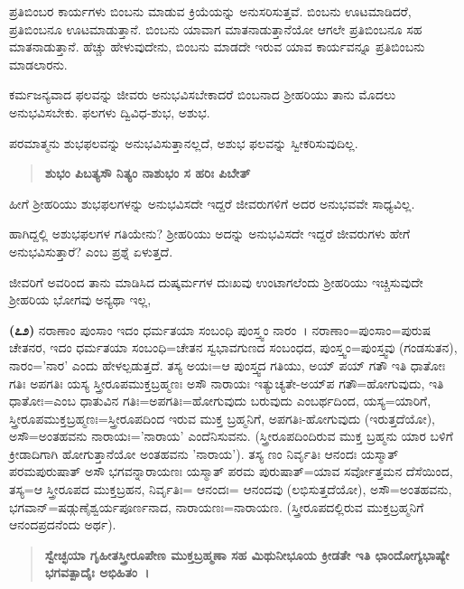 
\vskip 3pt

ಪ್ರತಿಬಿಂಬರ ಕಾರ್ಯಗಳು ಬಿಂಬನು ಮಾಡುವ ಕ್ರಿಯೆಯನ್ನು ಅನುಸರಿಸುತ್ತವೆ. ಬಿಂಬನು ಊಟಮಾಡಿದರೆ, ಪ್ರತಿಬಿಂಬನೂ ಊಟಮಾಡುತ್ತಾನೆ. ಬಿಂಬನು ಯಾವಾಗ ಮಾತನಾಡುತ್ತಾನೆಯೋ ಆಗಲೇ ಪ್ರತಿಬಿಂಬನೂ ಸಹ ಮಾತನಾಡುತ್ತಾನೆ. ಹೆಚ್ಚು ಹೇಳುವು\-ದೇನು, ಬಿಂಬನು ಮಾಡದೇ ಇರುವ ಯಾವ ಕಾರ್ಯವನ್ನೂ ಪ್ರತಿಬಿಂಬನು ಮಾಡಲಾರನು.

ಕರ್ಮಜನ್ಯವಾದ ಫಲವನ್ನು ಜೀವರು ಅನುಭವಿಸಬೇಕಾದರೆ ಬಿಂಬನಾದ ಶ‍್ರೀಹರಿಯು ತಾನು ಮೊದಲು ಅನುಭವಿಸಬೇಕು. ಫಲಗಳು ದ್ವಿವಿಧ-ಶುಭ, ಅಶುಭ.

ಪರಮಾತ್ಮನು ಶುಭಫಲವನ್ನು ಅನುಭವಿಸುತ್ತಾನಲ್ಲದೆ, ಅಶುಭ ಫಲವನ್ನು ಸ್ವೀಕರಿಸುವುದಿಲ್ಲ.

\begin{verse}
\textbf{ಶುಭಂ ಪಿಬತ್ಯಸೌ ನಿತ್ಯಂ ನಾಶುಭಂ ಸ ಹರಿಃ ಪಿಬೇತ್}
\end{verse}

\vspace{-.1cm}


\vskip 3pt

ಹೀಗೆ ಶ‍್ರೀಹರಿಯು ಶುಭಫಲಗಳನ್ನು ಅನುಭವಿಸದೇ ಇದ್ದರೆ ಜೀವರುಗಳಿಗೆ ಅದರ ಅನುಭವವೇ ಸಾಧ್ಯವಿಲ್ಲ.

ಹಾಗಿದ್ದಲ್ಲಿ ಅಶುಭಫಲಗಳ ಗತಿಯೇನು? ಶ‍್ರೀಹರಿಯು ಅದನ್ನು ಅನುಭವಿಸದೇ ಇದ್ದರೆ ಜೀವರುಗಳು ಹೇಗೆ ಅನುಭವಿಸುತ್ತಾರೆ? ಎಂಬ ಪ್ರಶ್ನೆ ಏಳುತ್ತದೆ.

ಜೀವರಿಗೆ ಅವರಿಂದ ತಾನು ಮಾಡಿಸಿದ ದುಷ್ಕರ್ಮಗಳ ದುಃಖವು ಉಂಟಾಗಲೆಂದು ಶ‍್ರೀಹರಿಯು ಇಚ್ಚಿಸುವುದೇ ಶ‍್ರೀಹರಿಯ ಭೋಗವು ಅನ್ಯಥಾ ಇಲ್ಲ,

\textbf{(೭೨)} ನರಾಣಾಂ ಪುಂಸಾಂ ಇದಂ ಧರ್ಮತಯಾ ಸಂಬಂಧಿ ಪುಂಸ್ತ್ವಂ ನಾರಂ~। ನರಾಣಾಂ=ಪುಂಸಾಂ=ಪುರುಷ ಚೇತನರ, ಇದಂ ಧರ್ಮತಯಾ ಸಂಬಂಧಿ=ಚೇತನ ಸ್ವಭಾವಗುಣದ ಸಂಬಂಧದ, ಪುಂಸ್ತ್ವಂ=ಪುಂಸ್ತ್ವವು (ಗಂಡಸುತನ), ನಾರಂ='ನಾರ' ಎಂದು ಹೇಳಲ್ಪಡುತ್ತದೆ. ತಸ್ಯ ಅಯಃ=ಆ ಪುಂಸ್ತ್ವದ ಗತಿಯು, ಅಯ್ ಪಯ್ ಗತೌ ಇತಿ ಧಾತೋಃ ಗತಿಃ ಅಪಗತಿಃ ಯಸ್ಯ ಸ್ತ್ರೀರೂಪಮುಕ್ತಬ್ರಹ್ಮಣಃ ಅಸೌ ನಾರಾಯಃ ಇತ್ಯುಚ್ಯತೇ-ಅಯ್‌ಪ ಗತೌ=ಹೋಗುವುದು, ಇತಿ ಧಾತೋಃ=ಎಂಬ ಧಾತುವಿನ ಗತಿಃ=ಅಪಗತಿಃ=ಹೋಗುವುದು ಬರುವುದು ಎಂಬರ್ಥದಿಂದ, ಯಸ್ಯ=ಯಾರಿಗೆ, ಸ್ತ್ರೀರೂಪಮುಕ್ತಬ್ರಹ್ಮಣಃ=ಸ್ತ್ರೀರೂಪದಿಂದ ಇರುವ ಮುಕ್ತ ಬ್ರಹ್ಮನಿಗೆ, ಅಪಗತಿಃ-ಹೋಗುವುದು (ಇರುತ್ತದೆಯೋ), ಅಸೌ=ಅಂತಹವನು ನಾರಾಯಃ='ನಾರಾಯ' ಎಂದೆನಿಸುವನು. (ಸ್ತ್ರೀರೂಪದಿಂದಿರುವ ಮುಕ್ತ ಬ್ರಹ್ಮನು ಯಾರ ಬಳಿಗೆ ಕ್ರೀಡಾದಿಗಾಗಿ ಹೋಗುತ್ತಾನೆಯೋ ಅಂತಹವನು 'ನಾರಾಯ'). ತಸ್ಯ ಣಂ ನಿರ್ವೃತಿಃ ಆನಂದಃ ಯಸ್ಮಾತ್ ಪರಮಪುರುಷಾತ್ ಅಸೌ ಭಗವನ್ನಾರಾಯಣಃ ಯಸ್ಮಾತ್ ಪರಮ ಪುರುಷಾತ್=ಯಾವ ಸರ್ವೋತ್ತಮನ ದೆಸೆಯಿಂದ, ತಸ್ಯ=ಆ ಸ್ತ್ರೀರೂಪದ ಮುಕ್ತಬ್ರಹನ, ನಿರ್ವೃತಿಃ= ಆನಂದಃ= ಆನಂದವು (ಲಭಿಸುತ್ತದೆಯೋ), ಅಸೌ=ಅಂತಹವನು, ಭಗವಾನ್=\-ಷಡ್ಗುಣೈಶ್ವರ್ಯಪೂರ್ಣನಾದ, ನಾರಾಯಣಃ=ನಾರಾಯಣ. (ಸ್ತ್ರೀರೂಪದಲ್ಲಿರುವ ಮುಕ್ತ\-ಬ್ರಹ್ಮನಿಗೆ ಆನಂದಪ್ರದನೆಂದು ಅರ್ಥ).

\begin{verse}
\textbf{ಸ್ವೇಚ್ಛಯಾ ಗೃಹೀತಸ್ತ್ರೀರೂಪೇಣ ಮುಕ್ತಬ್ರಹ್ಮಣಾ ಸಹ ಮಿಥುನೀಭೂಯ ಕ್ರೀಡತೇ ಇತಿ ಛಾಂದೋಗ್ಯಭಾಷ್ಯೇ ಭಗವತ್ಪಾದೈಃ ಅಭಿಹಿತಂ~।}
\end{verse}

